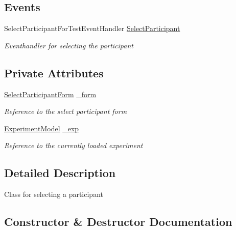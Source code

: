 \subsection*{Events}
\begin{DoxyCompactItemize}
\item 
Select\+Participant\+For\+Test\+Event\+Handler \hyperlink{class_web_analyzer_1_1_u_i_1_1_interaction_objects_1_1_select_participant_control_aed961b133694321fc9ba8bf431ade028}{Select\+Participant}
\begin{DoxyCompactList}\small\item\em Eventhandler for selecting the participant \end{DoxyCompactList}\end{DoxyCompactItemize}
\subsection*{Private Attributes}
\begin{DoxyCompactItemize}
\item 
\hyperlink{class_web_analyzer_1_1_u_i_1_1_select_participant_form}{Select\+Participant\+Form} \hyperlink{class_web_analyzer_1_1_u_i_1_1_interaction_objects_1_1_select_participant_control_ab50cc6cc34c9fe6cc96b8aff94350c49}{\+\_\+form}
\begin{DoxyCompactList}\small\item\em Reference to the select participant form \end{DoxyCompactList}\item 
\hyperlink{class_web_analyzer_1_1_models_1_1_base_1_1_experiment_model}{Experiment\+Model} \hyperlink{class_web_analyzer_1_1_u_i_1_1_interaction_objects_1_1_select_participant_control_ad422fced46a5eb4cf3cff068352e2af5}{\+\_\+exp}
\begin{DoxyCompactList}\small\item\em Reference to the currently loaded experiment \end{DoxyCompactList}\end{DoxyCompactItemize}


\subsection{Detailed Description}
Class for selecting a participant 



\subsection{Constructor \& Destructor Documentation}
\hypertarget{class_web_analyzer_1_1_u_i_1_1_interaction_objects_1_1_select_participant_control_a5e32876cf2be99557c7c68d2e127448e}{}
